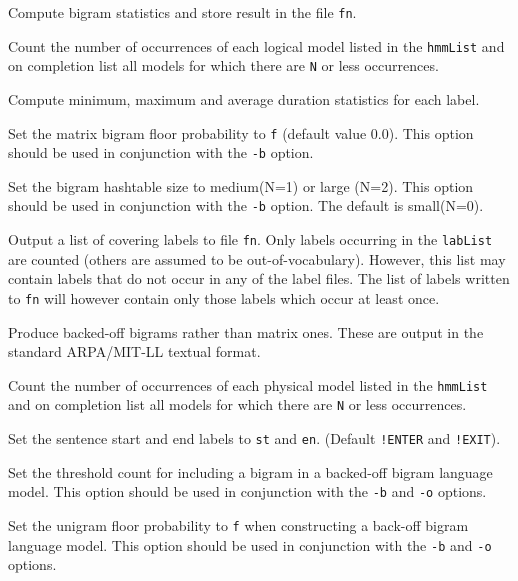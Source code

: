 \begin{optlist}

   Compute bigram statistics and store result in the
        file {\tt fn}.
  
   Count the number of occurrences of each logical model
    listed in the {\tt hmmList} and on completion list all models
    for which there are {\tt N} or less occurrences.

   Compute minimum, maximum and average duration statistics for each
        label.

   Set the matrix
      bigram floor probability to {\tt f} 
     (default value 0.0).  This option should be used in 
     conjunction with the {\tt -b} option.

   Set the bigram hashtable size to medium(N=1) or
        large (N=2).   This option should be used in 
        conjunction with the {\tt -b} option. The default is small(N=0).

    Output a list of covering labels to file {\tt fn}.
        Only labels occurring in the {\tt labList} are counted (others
        are assumed to be out-of-vocabulary).  
        However, this list may contain labels that do not occur in any of
        the label files.  The list of labels written to {\tt fn} will however
        contain only those labels which occur at least once.

    Produce backed-off bigrams rather than matrix ones.  These
        are output in the standard ARPA/MIT-LL textual format.

   Count the number of occurrences of each physical model
        listed in the {\tt hmmList} and on completion list all models
        for which there are {\tt N} or less occurrences.

   Set the sentence start and end labels to {\tt st} 
        and {\tt en}.  (Default {\tt !ENTER} and {\tt !EXIT}).

   Set the threshold count for including a bigram
         in a backed-off bigram language model.  This option should be used in 
        conjunction with the {\tt -b} and {\tt -o} options.
  
   Set the unigram floor probability to {\tt f} when
         constructing a back-off bigram language model. 
         This option should be used in 
        conjunction with the {\tt -b} and {\tt -o} options.
\stdoptG
\stdoptI
\end{optlist}

